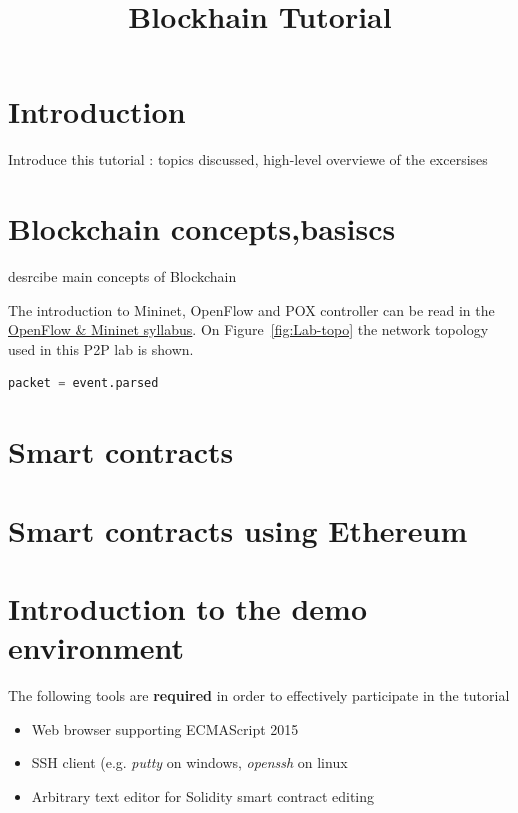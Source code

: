 \documentclass[a4paper]{article}
\title{Blockhain Tutorial}
\author{}
\date{}
\begin{document}
\maketitle

\tableofcontents

\section{Introduction}

Introduce this tutorial : topics discussed, high-level overviewe of the excersises

\section{Blockchain concepts,basiscs}

desrcibe main concepts of Blockchain 

The introduction to Mininet, OpenFlow and POX controller can be read in the
\href{https://qosip.tmit.bme.hu/foswiki/pub/Meres/OpenFlowMSc/OpenFlow-Mininet-syllabus-en.pdf}{OpenFlow \& Mininet
    syllabus}. On
Figure~\ref{fig:Lab-topo} the network topology used in this P2P lab is shown.


\begin{lstlisting}[language=python,frame=single,breaklines]
packet = event.parsed  
\end{lstlisting}


\section{Smart contracts}


\section{Smart contracts using Ethereum}


\section{Introduction to the demo environment}

The following tools are \textbf{required} in order to effectively participate in the tutorial
\begin{itemize}
    \item Web browser supporting ECMAScript 2015
    \item SSH client (e.g. \emph{putty} on windows, \emph{openssh} on linux
    \item Arbitrary text editor for Solidity smart contract editing
\end{itemize}{}
\end{document}
